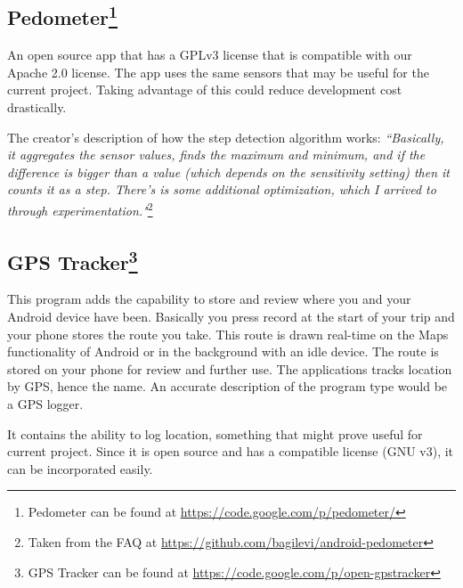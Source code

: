 \subsection{Pedometer\footnote{Pedometer can be found at \url{https://code.google.com/p/pedometer/}}}
An open source app that has a GPLv3 license that is compatible with our Apache 2.0 license. The app uses the same sensors that may be useful for the current project. Taking advantage of this could reduce development cost drastically.

The creator's description of how the step detection algorithm works: \textit{``Basically, it aggregates the sensor values, finds the maximum and minimum, and if the difference is bigger than a value (which depends on the sensitivity setting) then it counts it as a step. There's is some additional optimization, which I arrived to through experimentation."}\footnote{Taken from the FAQ at \url{https://github.com/bagilevi/android-pedometer}}

\subsection{GPS Tracker\footnote{GPS Tracker can be found at \url{https://code.google.com/p/open-gpstracker}}}
This program adds the capability to store and review where you and your Android device have been. Basically you press record at the start of your trip and your phone stores the route you take. This route is drawn real-time on the Maps functionality of Android or in the background with an idle device. The route is stored on your phone for review and further use. The applications tracks location by GPS, hence the name. An accurate description of the program type would be a GPS logger.

It contains the ability to log location, something that might prove useful for current project. Since it is open source and has a compatible license (GNU v3), it can be incorporated easily.

